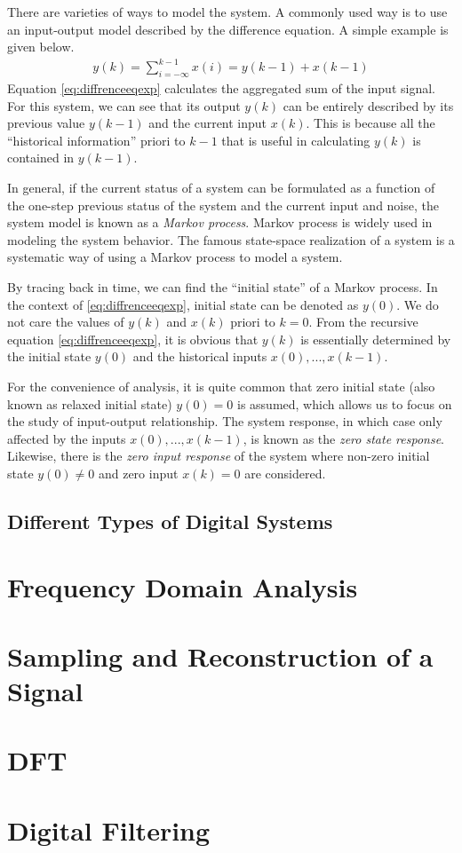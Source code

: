 There are varieties of ways to model the system. A commonly used way is to use an input-output model described by the difference equation. A simple example is given below.
\begin{eqnarray}
	y(k) = \sum_{i=-\infty}^{k-1}x(i) = y(k-1) + x(k-1) \label{eq:diffrenceeqexp}
\end{eqnarray}
Equation \eqref{eq:diffrenceeqexp} calculates the aggregated sum of the input signal. For this system, we can see that its output $y(k)$ can be entirely described by its previous value $y(k-1)$ and the current input $x(k)$. This is because all the ``historical information'' priori to $k-1$ that is useful in calculating $y(k)$ is contained in $y(k-1)$. 

In general, if the current status of a system can be formulated as a function of the one-step previous status of the system and the current input and noise, the system model is known as a \textit{Markov process}. Markov process is widely used in modeling the system behavior. The famous state-space realization of a system is a systematic way of using a Markov process to model a system. 

By tracing back in time, we can find the ``initial state'' of a Markov process. In the context of \eqref{eq:diffrenceeqexp}, initial state can be denoted as $y(0)$. We do not care the values of $y(k)$ and $x(k)$ priori to $k=0$. From the recursive equation \eqref{eq:diffrenceeqexp}, it is obvious that $y(k)$ is essentially determined by the initial state $y(0)$ and the historical inputs $x(0), ..., x(k-1)$.

For the convenience of analysis, it is quite common that zero initial state (also known as relaxed initial state) $y(0)=0$ is assumed, which allows us to focus on the study of input-output relationship. The system response, in which case only affected by the inputs $x(0), ..., x(k-1)$, is known as the \textit{zero state response}. Likewise, there is the \textit{zero input response} of the system where non-zero initial state $y(0)\neq 0$ and zero input $x(k)=0$ are considered.

\subsection{Different Types of Digital Systems} 

\section{Frequency Domain Analysis}

\section{Sampling and Reconstruction of a Signal}

\section{DFT}

\section{Digital Filtering}









